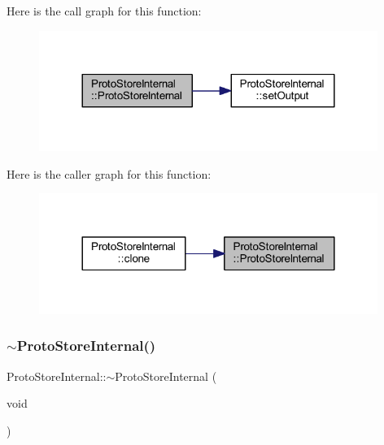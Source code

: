 Here is the call graph for this function\+:
\nopagebreak
\begin{figure}[H]
\begin{center}
\leavevmode
\includegraphics[width=312pt]{class_proto_store_internal_a16f69dbe9bc548f8bee41daa68c28ee5_cgraph}
\end{center}
\end{figure}
Here is the caller graph for this function\+:
\nopagebreak
\begin{figure}[H]
\begin{center}
\leavevmode
\includegraphics[width=312pt]{class_proto_store_internal_a16f69dbe9bc548f8bee41daa68c28ee5_icgraph}
\end{center}
\end{figure}
\mbox{\label{class_proto_store_internal_ae92712360ba192411e2bbc6a3f5b3366}} 
\subsubsection{\texorpdfstring{$\sim$ProtoStoreInternal()}{~ProtoStoreInternal()}}
{\footnotesize\ttfamily Proto\+Store\+Internal\+::$\sim$\+Proto\+Store\+Internal (\begin{DoxyParamCaption}\item[{void}]{ }\end{DoxyParamCaption})\hspace{0.3cm}{\ttfamily [virtual]}}



